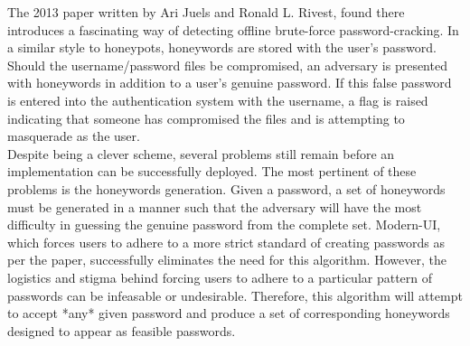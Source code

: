 The 2013 paper written by Ari Juels and Ronald L. Rivest, found  there%
introduces a fascinating way of detecting offline brute-force password-cracking. In a similar style to honeypots, honeywords are stored with the user's password. Should the username/password files be compromised, an adversary is presented with honeywords in addition to a user's genuine password. If this false password is entered into the authentication system with the username, a flag is raised indicating that someone has compromised the files and is attempting to masquerade as the user. \\

Despite being a clever scheme, several problems still remain before an implementation can be successfully deployed. The most pertinent of these problems is the honeywords generation. Given a password, a set of honeywords must be generated in a manner such that the adversary will have the most difficulty in guessing the genuine password from the complete set. Modern-UI, which forces users to adhere to a more strict standard of creating passwords as per the paper, successfully eliminates the need for this algorithm. However, the logistics and stigma behind forcing users to adhere to a particular pattern of passwords can be infeasable or undesirable. Therefore, this algorithm will attempt to accept *any* given password and produce a set of corresponding honeywords designed to appear as feasible passwords.\\




